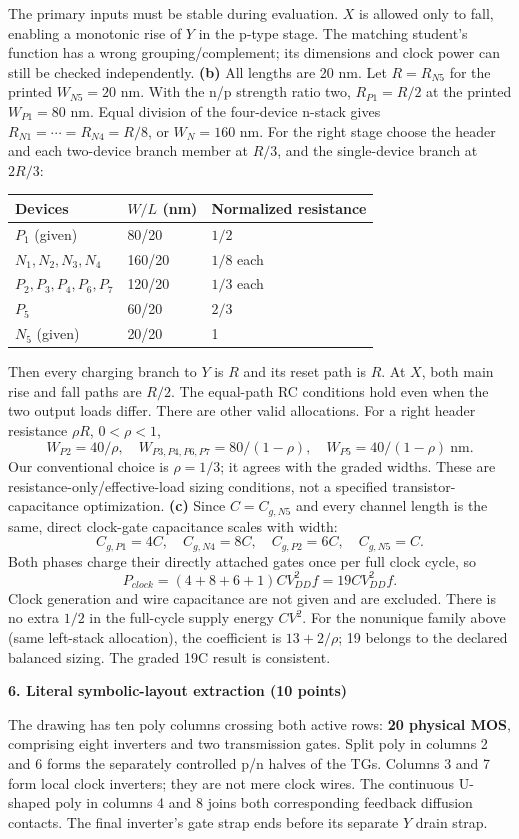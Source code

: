 \documentclass[10pt]{article}
\newcommand{\qheading}[1]{\par\medskip\textbf{#1}\par}
\begin{document}
The primary inputs must be stable during evaluation. $X$ is allowed only to fall, enabling a monotonic rise of $Y$ in the p-type stage. The matching student's function has a wrong grouping/complement; its dimensions and clock power can still be checked independently.
\textbf{(b)} All lengths are 20 nm. Let $R=R_{N5}$ for the printed $W_{N5}=20$ nm. With the n/p strength ratio two, $R_{P1}=R/2$ at the printed $W_{P1}=80$ nm. Equal division of the four-device n-stack gives $R_{N1}=\cdots=R_{N4}=R/8$, or $W_N=160$ nm. For the right stage choose the header and each two-device branch member at $R/3$, and the single-device branch at $2R/3$:
\begin{center}\begin{tabular}{lll}\toprule Devices&$W/L$ (nm)&Normalized resistance\\\midrule
$P_1$ (given)&80/20&$1/2$\\$N_1,N_2,N_3,N_4$&160/20&$1/8$ each\\
$P_2,P_3,P_4,P_6,P_7$&120/20&$1/3$ each\\$P_5$&60/20&$2/3$\\$N_5$ (given)&20/20&1\\\bottomrule\end{tabular}\end{center}
Then every charging branch to $Y$ is $R$ and its reset path is $R$. At $X$, both main rise and fall paths are $R/2$. The equal-path RC conditions hold even when the two output loads differ.
There are other valid allocations. For a right header resistance $\rho R$, $0<\rho<1$,
\[W_{P2}=40/\rho,\quad W_{P3,P4,P6,P7}=80/(1-\rho),\quad W_{P5}=40/(1-\rho)\ \mathrm{nm}.\]
Our conventional choice is $\rho=1/3$; it agrees with the graded widths. These are resistance-only/effective-load sizing conditions, not a specified transistor-capacitance optimization.
\newpage
\textbf{(c)} Since $C=C_{g,N5}$ and every channel length is the same, direct clock-gate capacitance scales with width:
\[C_{g,P1}=4C,\quad C_{g,N4}=8C,\quad C_{g,P2}=6C,\quad C_{g,N5}=C.\]
Both phases charge their directly attached gates once per full clock cycle, so
\[\boxed{P_{clock}=(4+8+6+1)CV_{DD}^2f=19CV_{DD}^2f.}\]
Clock generation and wire capacitance are not given and are excluded. There is no extra $1/2$ in the full-cycle supply energy $CV^2$. For the nonunique family above (same left-stack allocation), the coefficient is $13+2/\rho$; 19 belongs to the declared balanced sizing. The graded 19C result is consistent.
\qheading{6. Literal symbolic-layout extraction (10 points)}
The drawing has ten poly columns crossing both active rows: \textbf{20 physical MOS}, comprising eight inverters and two transmission gates. Split poly in columns 2 and 6 forms the separately controlled p/n halves of the TGs. Columns 3 and 7 form local clock inverters; they are not mere clock wires. The continuous U-shaped poly in columns 4 and 8 joins both corresponding feedback diffusion contacts. The final inverter's gate strap ends before its separate $Y$ drain strap.
\end{document}
